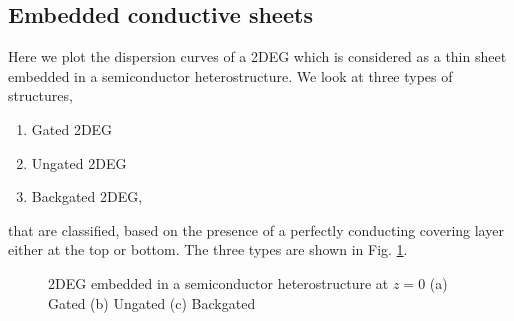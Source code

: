 \documentclass[12pt]{article}
\begin{document}
\subsection{Embedded conductive sheets}
%
%
Here we plot the dispersion curves of a 2DEG which is considered as a thin sheet embedded in a semiconductor heterostructure. We look at three types of structures,
%
\begin{enumerate}
  \item Gated 2DEG
  \item Ungated 2DEG
  \item Backgated 2DEG,
\end{enumerate}
%
that are classified, based on the presence of a perfectly conducting covering layer either at the top or bottom. The three types are shown in Fig. \ref{fig:2deg_structure_types}.
%
\begin{figure}[!htbp]
   \hfil
   \hfil
   \hfil
  \caption{2DEG embedded in a semiconductor heterostructure at $z=0$ (a) Gated  (b) Ungated (c) Backgated}
  \label{fig:2deg_structure_types}
\end{figure}
%
\end{document}
